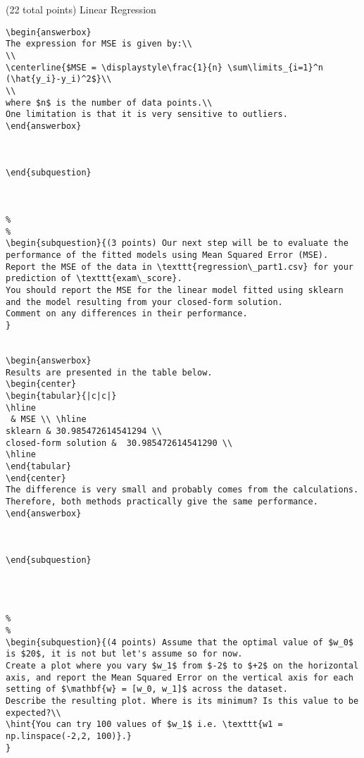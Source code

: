 \documentclass[12pt]{article}
\begin{document}
\begin{question}{(22 total points) Linear Regression}
\begin{subquestion}
\begin{answerbox}{20em}
\begin {verbatim}
\begin{answerbox}{10em}
The expression for MSE is given by:\\
\\
\centerline{$MSE = \displaystyle\frac{1}{n} \sum\limits_{i=1}^n (\hat{y_i}-y_i)^2$}\\
\\
where $n$ is the number of data points.\\
One limitation is that it is very sensitive to outliers.
\end{answerbox}



\end{subquestion}


 
%
%
\begin{subquestion}{(3 points) Our next step will be to evaluate the performance of the fitted models using Mean Squared Error (MSE). 
Report the MSE of the data in \texttt{regression\_part1.csv} for your prediction of \texttt{exam\_score}.
You should report the MSE for the linear model fitted using sklearn and the model resulting from your closed-form solution. 
Comment on any differences in their performance. 
}


\begin{answerbox}{10em}
Results are presented in the table below.
\begin{center}
\begin{tabular}{|c|c|}
\hline
 & MSE \\ \hline
sklearn & 30.985472614541294 \\
closed-form solution &  30.985472614541290 \\
\hline
\end{tabular}
\end{center}
The difference is very small and probably comes from the calculations. Therefore, both methods practically give the same performance.
\end{answerbox}



\end{subquestion}




%
%
\begin{subquestion}{(4 points) Assume that the optimal value of $w_0$ is $20$, it is not but let's assume so for now. 
Create a plot where you vary $w_1$ from $-2$ to $+2$ on the horizontal axis, and report the Mean Squared Error on the vertical axis for each setting of $\mathbf{w} = [w_0, w_1]$ across the dataset. 
Describe the resulting plot. Where is its minimum? Is this value to be expected?\\ 
\hint{You can try 100 values of $w_1$ i.e. \texttt{w1 = np.linspace(-2,2, 100)}.}
}



\end{verbatim}
\end{answerbox}
\end{subquestion}
\end{question}
\end{document}

